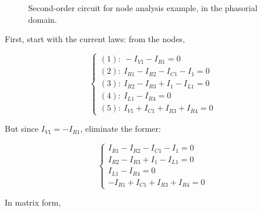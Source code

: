 \begin{example}
\begin{figure}[htb!]
	\caption{Second-order circuit for node analysis example, in the phasorial domain.}
	\label{fig:nodeanalysis_example_phasorial}
\end{figure} %

	First, start with the current laws: from the nodes,

\begin{equation} %
	\left\{\begin{array}{l}
		(1):\ -I_{V1} - I_{R1} = 0 \\[3mm]
		(2):\  I_{R1} - I_{R2} - I_{C1} - I_1 = 0 \\[3mm]
		(3):\  I_{R2} - I_{R3} + I_1 - I_{L1} = 0 \\[3mm]
		(4):\  I_{L1} - I_{R4} = 0 \\[3mm] 
		(5):\  I_{V1} + I_{C1} + I_{R3} + I_{R4} = 0 
	\end{array}\right.
\end{equation} %

	But since $I_{V1} = -I_{R1}$, eliminate the former:

\begin{equation} %
	\left\{\begin{array}{l}
		 I_{R1} - I_{R2} - I_{C1} - I_1 = 0 \\[3mm]
		 I_{R2} - I_{R3} + I_1 - I_{L1} = 0 \\[3mm]
		 I_{L1} - I_{R4} = 0 \\[3mm] 
		 -I_{R1} + I_{C1} + I_{R3} + I_{R4} = 0 
	\end{array}\right.
\end{equation} %

	In matrix form,


\end{example}
